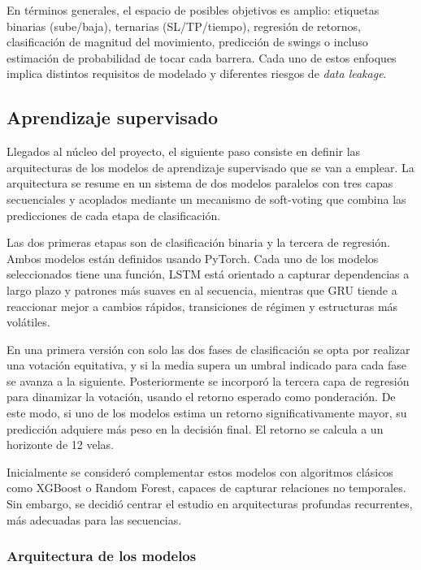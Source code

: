 En términos generales, el espacio de posibles objetivos es amplio: etiquetas binarias (sube/baja), ternarias (SL/TP/tiempo), regresión de retornos,
clasificación de magnitud del movimiento, predicción de swings o incluso estimación de probabilidad de tocar cada barrera. Cada uno de estos enfoques
implica distintos requisitos de modelado y diferentes riesgos de \textit{data leakage}.

\subsection{Aprendizaje supervisado}

Llegados al núcleo del proyecto, el siguiente paso consiste en definir las arquitecturas de los modelos de aprendizaje supervisado que se van a
emplear. La arquitectura se resume en un sistema de dos modelos paralelos con tres capas secuenciales y acoplados mediante un mecanismo de
soft-voting que combina las predicciones de cada etapa de clasificación.

Las dos primeras etapas son de clasificación binaria y la tercera de regresión. Ambos modelos están definidos usando PyTorch. Cada uno de los modelos
seleccionados tiene una función, LSTM está orientado a capturar dependencias a largo plazo y patrones más suaves en al secuencia, mientras que GRU
tiende a reaccionar mejor a cambios rápidos, transiciones de régimen y estructuras más volátiles.

En una primera versión con solo las dos fases de clasificación se opta por realizar una votación equitativa, y si la media supera un umbral indicado
para cada fase se avanza a la siguiente. Posteriormente se incorporó la tercera capa de regresión para dinamizar la votación, usando el retorno
esperado como ponderación. De este modo, si uno de los modelos estima un retorno significativamente mayor, su predicción adquiere más peso en la
decisión final. El retorno se calcula a un horizonte de 12 velas.

Inicialmente se consideró complementar estos modelos con algoritmos clásicos como XGBoost o Random Forest, capaces de capturar relaciones no
temporales. Sin embargo, se decidió centrar el estudio en arquitecturas profundas recurrentes, más adecuadas para las secuencias.

\subsubsection{Arquitectura de los modelos}

